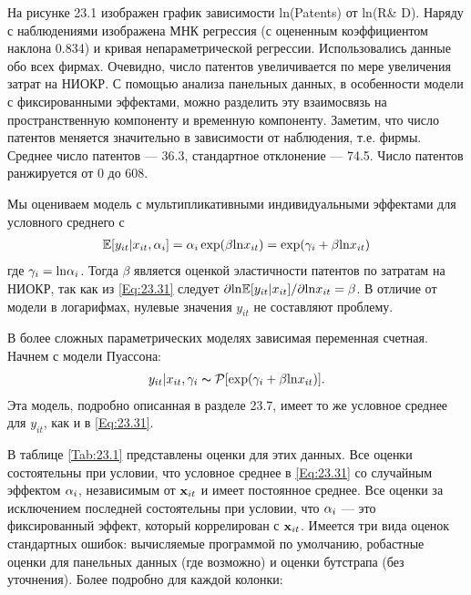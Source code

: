 На рисунке 23.1 изображен график зависимости ln(Patents) от ln(R\& D). Наряду с наблюдениями изображена МНК регрессия (с оцененным коэффициентом наклона 0.834) и кривая непараметрической регрессии. Использовались данные обо всех фирмах. Очевидно, число патентов увеличивается по мере увеличения затрат на НИОКР. С помощью анализа панельных данных, в особенности модели с фиксированными эффектами, можно разделить эту взаимосвязь на пространственную компоненту и временную компоненту. Заметим, что число патентов меняется значительно в зависимости от наблюдения, т.е. фирмы. Среднее число патентов --- 36.3, стандартное отклонение --- 74.5. Число патентов ранжируется от 0 до 608.

Мы оцениваем модель с мультипликативными индивидуальными эффектами для условного среднего с 
\begin{align}
\mathbb{E}[y_{it}|x_{it}, \alpha_i] = \alpha_i \exp (\beta \mathrm{ln} x_{it})=\exp  (\gamma_i+\beta \mathrm{ln} x_{it})
\label{Eq:23.31}
\end{align}
где $\gamma_i=\mathrm{ln} \alpha_i$. Тогда $\beta$ является оценкой эластичности патентов по затратам на НИОКР, так как из \ref{Eq:23.31} следует $\partial \mathrm{ln} \mathbb{E}[y_{it}|x_{it}]/\partial \mathrm{ln} x_{it}=\beta$. В отличие от модели в логарифмах, нулевые значения $y_{it}$ не составляют проблему.

В более сложных параметрических моделях зависимая переменная счетная. Начнем с модели Пуассона:
\begin{align}
y_{it}|x_{it}, \gamma_i \thicksim \mathcal{P}[\exp (\gamma_i + \beta \mathrm{ln} x_{it})].
\label{Eq:23.32}
\end{align}
Эта модель, подробно описанная в разделе 23.7, имеет то же условное среднее для $y_{it}$, как и в \ref{Eq:23.31}.

В таблице \ref{Tab:23.1} представлены оценки для этих данных. Все оценки состоятельны при условии, что условное среднее в \ref{Eq:23.31} со случайным эффектом $\alpha_i$, независимым от $\mathbf{x}_{it}$ и имеет постоянное среднее. Все оценки за исключением последней состоятельны при условии, что $\alpha_i$ --- это фиксированный эффект, который коррелирован с $\mathbf{x}_{it}$. Имеется три вида оценок стандартных ошибок: вычисляемые программой по умолчанию, робастные оценки для панельных данных (где возможно) и оценки бутстрапа (без уточнения). Более подробно для каждой колонки:

